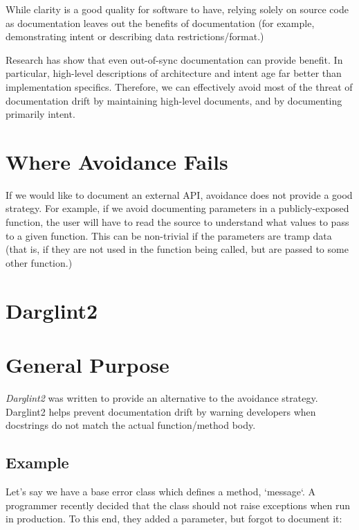 \documentclass[landscape]{sciposter}
\begin{document}
\begin{multicols}{4}
        While clarity is a good quality for software to have, relying solely
        on source code as documentation leaves out the benefits of
        documentation (for example, demonstrating intent or describing data
        restrictions/format.)

        Research has show that even out-of-sync documentation can provide
        benefit.  In particular, high-level descriptions of architecture
        and intent age far better than implementation specifics.  Therefore,
        we can effectively avoid most of the threat of documentation drift
        by maintaining high-level documents, and by documenting primarily
        intent.

    \section{Where Avoidance Fails}
         If we would like to document an external API, avoidance does not
         provide a good strategy.  For example, if we avoid documenting
         parameters in a publicly-exposed function, the user will have to
         read the source to understand what values to pass to a given function.
         This can be non-trivial if the parameters are tramp data (that is,
         if they are not used in the function being called, but are passed
         to some other function.)

    \section{Darglint2}

    \section{General Purpose}
        \textit{Darglint2} was written to provide an alternative to the
        avoidance strategy.  Darglint2 helps prevent documentation drift
        by warning developers when docstrings do not match the actual
        function/method body.

        \subsection{Example}
            Let's say we have a base error class which defines a method,
            `message`.  A programmer recently decided that the class should
            not raise exceptions when run in production.  To this end,
            they added a parameter, but forgot to document it:


\end{multicols}
\end{document}
